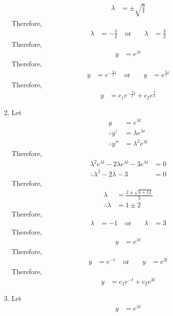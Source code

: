 \documentclass[fleqn, a4paper, 11pt, oneside]{amsart}
\theoremstyle{definition}
\theoremstyle{theorem}
\begin{document}
\begin{solution}
\begin{enumerate}[leftmargin = *]
\begin{align*}
				\lambda & = \pm \sqrt{\frac{9}{4}}
			\end{align*}
			Therefore,
			\begin{align*}
				\lambda & = -\frac{3}{2} & \text{ or } &  & \lambda & = \frac{3}{2}
			\end{align*}
			Therefore,
			\begin{align*}
				y & = e^{\lambda t}
			\end{align*}
			Therefore,
			\begin{align*}
				y & = e^{-\frac{3}{2} t} & \text{ or } &  & y & = e^{\frac{3}{2} t}
			\end{align*}
			Therefore,
			\begin{align*}
				y &= c_1 e^{-\frac{3}{2} t} + c_2 e^{\frac{3}{2}}
			\end{align*}
		\item
			Let
			\begin{align*}
				y              & = e^{\lambda t}         \\
				\therefore y'  & = \lambda e^{\lambda t} \\
				\therefore y'' & = \lambda^2 e^{\lambda t}
			\end{align*}
			Therefore,
			\begin{align*}
				\lambda^2 e^{\lambda t} - 2 \lambda e^{\lambda t} - 3 e^{\lambda t} & = 0 \\
				\therefore \lambda^2 - 2 \lambda - 3                                & = 0
			\end{align*}
			Therefore,
			\begin{align*}
				\lambda            & = \frac{2 \pm \sqrt{4 + 12}}{2} \\
				\therefore \lambda & = 1 \pm 2
			\end{align*}
			Therefore,
			\begin{align*}
				\lambda & = -1 & \text{ or } &  & \lambda & = 3
			\end{align*}
			Therefore,
			\begin{align*}
				y & = e^{\lambda t}
			\end{align*}
			Therefore,
			\begin{align*}
				y & = e^{-t} & \text{ or } &  & y & = e^{3 t}
			\end{align*}
			Therefore,
			\begin{align*}
				y &= c_1 e^{-t} + c_2 e^{3 t}
			\end{align*}
		\item
			Let
			\begin{align*}
				y              & = e^{\lambda t}         \\

\end{align*}
\end{enumerate}
\end{solution}
\end{document}
